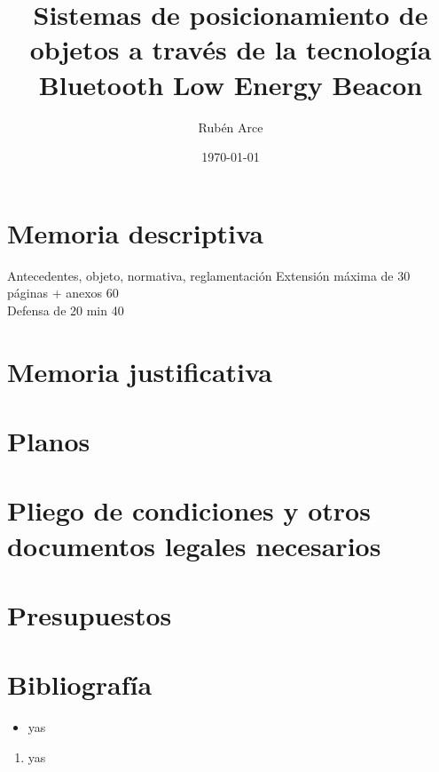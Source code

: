 \documentclass[a4paper ,12pt, onecolumn]{article}
\begin{document}
\title{Sistemas de posicionamiento de objetos a través de la tecnología Bluetooth Low Energy
Beacon }
\author{Rubén Arce}
\date{\today}
\maketitle
\tableofcontents

    
    
    
    
    \section{Memoria descriptiva}
    Antecedentes, objeto, normativa, reglamentación
    Extensión máxima de 30 páginas + anexos 60\\
    Defensa de 20 min  40\\
    \section{Memoria justificativa}
    \section{Planos}
    \section{Pliego de condiciones y otros documentos legales necesarios}
    \section{Presupuestos}
    \section{Bibliografía}
    
    \begin{itemize}
        \item  yas
    \end{itemize}
    \begin{enumerate}
        \item  yas
    \end{enumerate}
\end{document}
